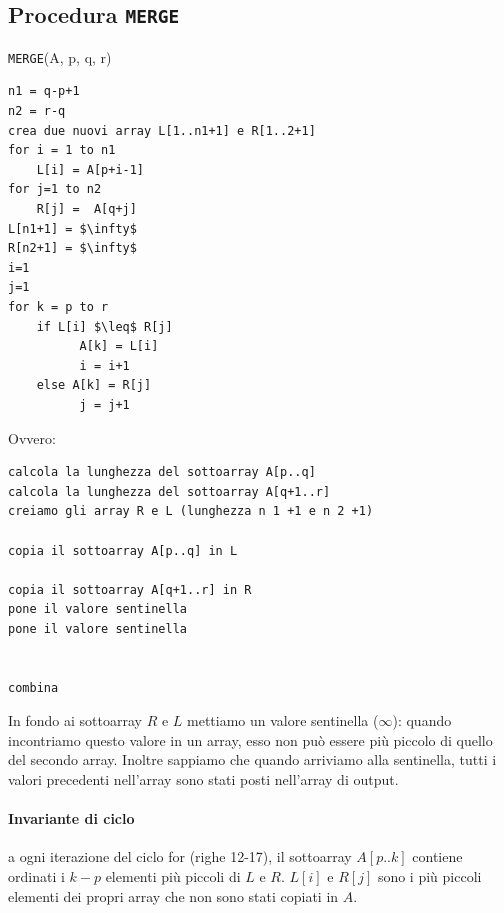 \documentclass[11pt,a4paper]{article}
\begin{document}
\subsection{Procedura \texttt{MERGE}}
\texttt{MERGE}(A, p, q, r)
\begin{lstlisting}[mathescape=true]
n1 = q-p+1
n2 = r-q
crea due nuovi array L[1..n1+1] e R[1..2+1]
for i = 1 to n1
    L[i] = A[p+i-1]
for j=1 to n2
    R[j] =  A[q+j]
L[n1+1] = $\infty$
R[n2+1] = $\infty$
i=1
j=1
for k = p to r
    if L[i] $\leq$ R[j]
          A[k] = L[i]
          i = i+1
    else A[k] = R[j]
          j = j+1
\end{lstlisting}
%
Ovvero:
\begin{lstlisting}
calcola la lunghezza del sottoarray A[p..q]
calcola la lunghezza del sottoarray A[q+1..r]
creiamo gli array R e L (lunghezza n 1 +1 e n 2 +1)

copia il sottoarray A[p..q] in L

copia il sottoarray A[q+1..r] in R
pone il valore sentinella
pone il valore sentinella


combina
\end{lstlisting}
\medskip\medskip
In fondo ai sottoarray $R$ e $L$ mettiamo un valore sentinella ($\infty$): quando incontriamo questo valore in un array,
esso non può essere più piccolo di quello del secondo array. Inoltre sappiamo che quando arriviamo alla
sentinella, tutti i valori precedenti nell’array sono stati posti nell’array di output.

\paragraph{Invariante di ciclo} a ogni iterazione del ciclo for (righe 12-17), il sottoarray $A[p..k]$ contiene ordinati i $k-p$ elementi più piccoli di $L$ e $R$. $L[i]$ e $R[j]$ sono i più piccoli elementi dei propri array che non sono stati copiati in $A$.
\end{document}
